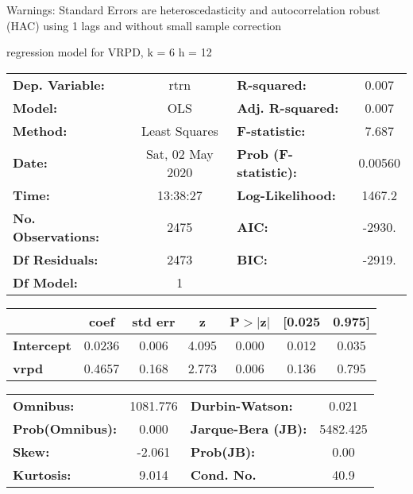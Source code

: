 Warnings: \newline
 [1] Standard Errors are heteroscedasticity and autocorrelation robust (HAC) using 1 lags and without small sample correction\ 

regression model for VRPD, k = 6 h = 12\begin{center}
\begin{tabular}{lclc}
\toprule
\textbf{Dep. Variable:}    &       rtrn       & \textbf{  R-squared:         } &     0.007   \\
\textbf{Model:}            &       OLS        & \textbf{  Adj. R-squared:    } &     0.007   \\
\textbf{Method:}           &  Least Squares   & \textbf{  F-statistic:       } &     7.687   \\
\textbf{Date:}             & Sat, 02 May 2020 & \textbf{  Prob (F-statistic):} &  0.00560    \\
\textbf{Time:}             &     13:38:27     & \textbf{  Log-Likelihood:    } &    1467.2   \\
\textbf{No. Observations:} &        2475      & \textbf{  AIC:               } &    -2930.   \\
\textbf{Df Residuals:}     &        2473      & \textbf{  BIC:               } &    -2919.   \\
\textbf{Df Model:}         &           1      & \textbf{                     } &             \\
\bottomrule
\end{tabular}
\begin{tabular}{lcccccc}
                   & \textbf{coef} & \textbf{std err} & \textbf{z} & \textbf{P$> |$z$|$} & \textbf{[0.025} & \textbf{0.975]}  \\
\midrule
\textbf{Intercept} &       0.0236  &        0.006     &     4.095  &         0.000        &        0.012    &        0.035     \\
\textbf{vrpd}      &       0.4657  &        0.168     &     2.773  &         0.006        &        0.136    &        0.795     \\
\bottomrule
\end{tabular}
\begin{tabular}{lclc}
\textbf{Omnibus:}       & 1081.776 & \textbf{  Durbin-Watson:     } &    0.021  \\
\textbf{Prob(Omnibus):} &   0.000  & \textbf{  Jarque-Bera (JB):  } & 5482.425  \\
\textbf{Skew:}          &  -2.061  & \textbf{  Prob(JB):          } &     0.00  \\
\textbf{Kurtosis:}      &   9.014  & \textbf{  Cond. No.          } &     40.9  \\
\bottomrule
\end{tabular}
\end{center}


